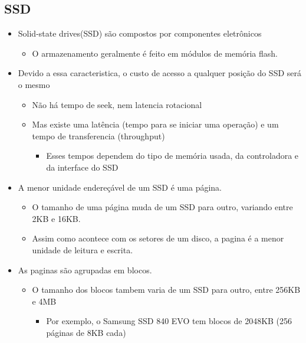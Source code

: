 \documentclass[12pt]{article}
\begin{document}
    \subsection{SSD}
    \begin{itemize}
        \item Solid-state drives(SSD) são compostos por componentes eletrônicos
        \begin{itemize}
            \item O armazenamento geralmente é feito em módulos de memória flash.
        \end{itemize}
        \item Devido a essa caracteristica, o custo de acesso a qualquer 
        posição do SSD será o mesmo
        \begin{itemize}
            \item Não há tempo de seek, nem latencia rotacional
            \item Mas existe uma latência (tempo para se iniciar uma operação) 
            e um tempo de transferencia (throughput)
            \begin{itemize}
                \item Esses tempos dependem do tipo de memória usada, da 
                controladora e da interface do SSD
            \end{itemize}
        \end{itemize}
        \item A menor unidade endereçável de um SSD é uma página.
        \begin{itemize}
            \item O tamanho de uma página muda de um SSD para outro, variando 
            entre 2KB e 16KB.
            \item Assim como acontece com os setores de um disco, a pagina é a 
            menor unidade de leitura e escrita.
        \end{itemize}
        \item As paginas são agrupadas em blocos.
        \begin{itemize}
            \item O tamanho dos blocos tambem varia de um SSD para outro, 
            entre 256KB e 4MB 
            \begin{itemize}
                \item Por exemplo, o Samsung SSD 840 EVO tem blocos de 2048KB 
                (256 páginas de 8KB cada)
            \end{itemize}

\end{itemize}
\end{itemize}
\end{document}

